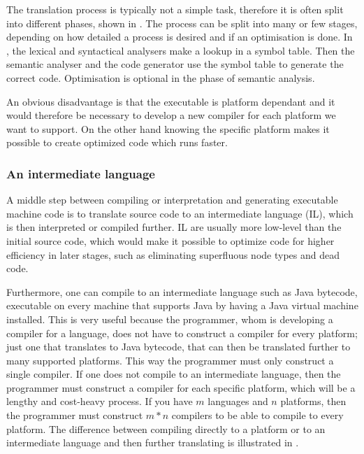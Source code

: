 The translation process is typically not a simple task,
therefore it is often split into different phases, shown in
. The process can be split into many or
few stages, depending on how detailed a process is desired and if an
optimisation is done. In , the lexical and
syntactical analysers make a lookup in a symbol table. Then the semantic
analyser and the code generator use the symbol table to generate
the correct code. Optimisation is optional in the phase of semantic
analysis\cite[p. 46]{sebesta2013}.



An obvious disadvantage is that the executable is platform dependant
and it would therefore be necessary to develop a new compiler for each
platform we want to support. On the other hand knowing the specific
platform makes it possible to create optimized code which runs faster.

\subsubsection{An intermediate language}
\label{sec:intermediatelanguage}
A middle step between compiling or interpretation and generating executable
machine code is to translate source code to an intermediate language (IL), which
is then interpreted or compiled further. IL are usually more low-level than the
initial source code, which would make it possible to optimize code for higher
efficiency in later stages, such as eliminating superfluous node types and dead
code.

Furthermore, one can compile to an intermediate language such as Java bytecode,
executable on every machine that supports Java by having a Java virtual machine
installed. This is very useful because the programmer, whom is developing a
compiler for a language, does not have to construct a compiler for every
platform; just one that translates to Java bytecode, that can then be translated
further to many supported platforms. This way the programmer must only construct a
single compiler. If one does not compile to an intermediate language, then the
programmer must construct a compiler for each specific platform, which will be a
lengthy and cost-heavy process. If you have $m$ languages and $n$ platforms,
then the programmer must construct $m*n$ compilers to be able to compile to
every platform. The difference between compiling directly to a platform or to an
intermediate language and then further translating is illustrated in
.

